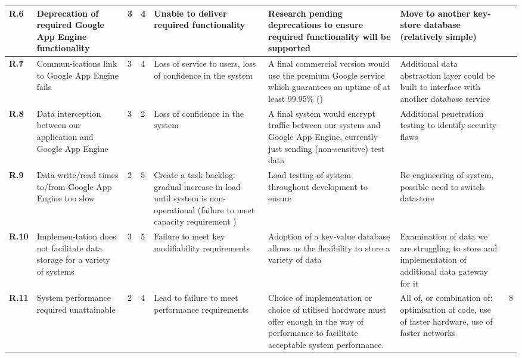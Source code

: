 \begin{longtable}[H]{| p{0.65cm} | p{2cm} | p{0.3cm} | p{0.3cm} | p{2.4cm} | p{3cm} | p{2.7cm} | p{0.4cm} |}
  \hline \textbf{R.6}
  & Deprecation of required Google App Engine functionality
  & 3
  & 4
  & Unable to deliver required functionality
  & Research pending deprecations to ensure required functionality will be supported
  & Move to another key-store database (relatively simple)
  & \\
  
  
  \hline \textbf{R.7}
  & Commun-ications link to Google App Engine fails
  & 3
  & 4
  & Loss of service to users, loss of confidence in the system
  & A final commercial version would use the premium Google service which guarantees an uptime of at least 99.95\% (\nfrit10)
  & Additional data abstraction layer could be built to interface with another database service
  & \\
  
  \hline \textbf{R.8}
  & Data interception between our application and Google App Engine 
  & 3
  & 2
  & Loss of confidence in the system
  & A final system would encrypt traffic between our system and Google App Engine, currently just sending (non-sensitive) test data
  & Additional penetration testing to identify security flaws
  & \\
  
  \hline \textbf{R.9}
  & Data write/read times to/from Google App Engine too slow
  & 2
  & 5
  & Create a task backlog: gradual increase in load until system
  is non-operational (failure to meet capacity requirement \nfrit9)
  & Load testing of system throughout development to ensure \nfrit9
  & Re-engineering of system, possible need to switch datastore
  & \\
  
  \hline \textbf{R.10}
  & Implemen-tation does not facilitate data storage for a variety of systems
  & 3
  & 5
  & Failure to meet key modifiability requirements 
  & Adoption of a key-value database allows us the flexibility to store a variety of data
  & Examination of data we are struggling to store and implementation of additional data gateway for it
  & \\  
  
  \hline \textbf{R.11}
  & System performance required unattainable
  & 2
  & 4
  & Lead to failure to meet performance requirements 
  & Choice of implementation or choice of utilised hardware must offer
  enough in the way of performance to facilitate acceptable system
  performance.
  & All of, or combination of: optimisation of code, use of faster
  hardware, use of faster networks
  & 8 \\    
  

\end{longtable}
